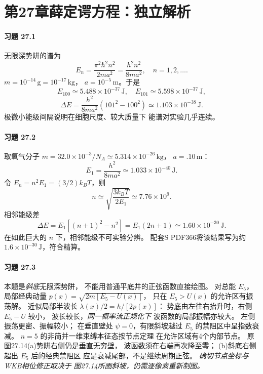\section*{第27章\quad 薛定谔方程：独立解析}
\paragraph{习题 27.1}
无限深势阱的谱为
\[
E_n=\frac{\pi^2\hbar^2 n^2}{2ma^2}
=\frac{h^2n^2}{8ma^2},\quad n=1,2,\ldots.
\]
\(m=10^{-14}\,\mathrm g=10^{-17}\,\mathrm{kg}\)，
\(a=10^{-5}\,\mathrm m\)。于是
\[
\boxed{E_{100}\simeq5.488\times10^{-37}\,\mathrm J},
\quad
\boxed{E_{101}\simeq5.598\times10^{-37}\,\mathrm J},
\]
\[
\boxed{\Delta E
=\frac{h^2}{8ma^2}(101^2-100^2)
\simeq1.103\times10^{-38}\,\mathrm J}.
\]
极微小能级间隔说明在细胞尺度、较大质量下
能谱对实验几乎连续。

\paragraph{习题 27.2}
取氧气分子 \(m=32.0\times10^{-3}/N_A
\simeq5.314\times10^{-26}\,\mathrm{kg}\)，
\(a=.10\,\mathrm m\)：
\[
\boxed{E_1=\frac{h^2}{8ma^2}
\simeq1.033\times10^{-40}\,\mathrm J}.
\]
令 \(E_n=n^2E_1=(3/2)k_BT\)，则
\[
\boxed{n\simeq\sqrt{\frac{3k_BT}{2E_1}}
\simeq7.76\times10^9}.
\]
相邻能级差
\[
\boxed{\Delta E
=E_1[(n+1)^2-n^2]=E_1(2n+1)
\simeq1.60\times10^{-30}\,\mathrm J}.
\]
在如此巨大的 \(n\) 下，相邻能级不可实验分辨。
配套S PDF366将该结果写为约
\(1.6\times10^{-30}\,\mathrm J\)，符合精算。

\paragraph{习题 27.3}
本题是\emph{斜底}无限深势阱，
不能用普通平底井的正弦函数直接绘图。
对总能 \(E_5\)，局部经典动量
\(p(x)=\sqrt{2m[E_5-U(x)]}\)，
只在 \(E_5>U(x)\) 的允许区有振荡解。
近似局部半波长
\(\lambda(x)/2=h/[2p(x)]\)：
势底由左往右抬升时，右侧 \(E_5-U\) 较小，
波长较长，\emph{同一概率流正规化下}
波函数的局部振幅亦较大。
左侧振荡更密、振幅较小；
在垂直壁处 \(\psi=0\)，有限斜坡越过
\(E_5\) 的禁阻区中呈指数衰减。
\(n=5\) 的非简并一维束缚本征态按节点定理
在允许区域有4个内部节点。
原图27.14(a)势阱右侧仍是垂直无穷壁，
波函数须在右端再次降至零；
(b)斜底右侧超出 \(E_5\) 后的经典禁阻区
应是衰减尾部，不是继续周期正弦。
\textit{确切节点坐标与WKB相位修正取决于
图27.14所画斜坡，仍需逐像素重新制图。}


